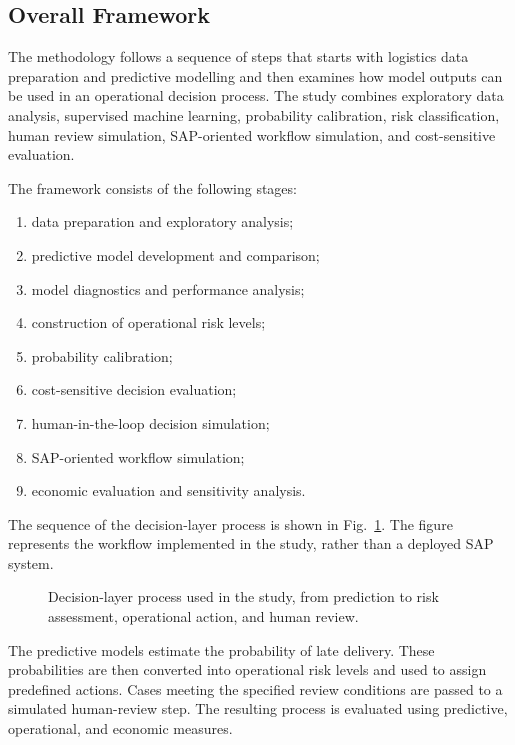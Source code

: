 \documentclass[10pt,a4paper]{article}
\providecommand{\Description}[1]{}
\begin{document}
\subsection{Overall Framework}

The methodology follows a sequence of steps that starts with logistics
data preparation and predictive modelling and then examines how model
outputs can be used in an operational decision process. The study
combines exploratory data analysis, supervised machine learning,
probability calibration, risk classification, human review simulation,
SAP-oriented workflow simulation, and cost-sensitive evaluation.

The framework consists of the following stages:
\begin{enumerate}
    \item data preparation and exploratory analysis;
    \item predictive model development and comparison;
    \item model diagnostics and performance analysis;
    \item construction of operational risk levels;
    \item probability calibration;
    \item cost-sensitive decision evaluation;
    \item human-in-the-loop decision simulation;
    \item SAP-oriented workflow simulation;
    \item economic evaluation and sensitivity analysis.
\end{enumerate}

The sequence of the decision-layer process is shown in
Fig.~\ref{fig:decision_pipeline}. The figure represents the workflow
implemented in the study, rather than a deployed SAP system.

\begin{figure}[H]
\centering

\caption{Decision-layer process used in the study, from prediction to
risk assessment, operational action, and human review.}
\Description{Decision-layer workflow from prediction through risk assessment, operational action, and human review.}
\label{fig:decision_pipeline}
\end{figure}

The predictive models estimate the probability of late delivery. These
probabilities are then converted into operational risk levels and used
to assign predefined actions. Cases meeting the specified review
conditions are passed to a simulated human-review step. The resulting
process is evaluated using predictive, operational, and economic
measures.
\end{document}

